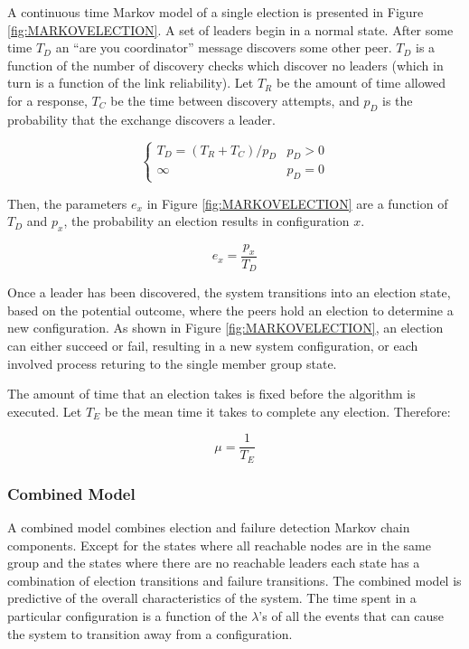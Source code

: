 A continuous time Markov model of a single election is presented in Figure \ref{fig:MARKOVELECTION}.
A set of leaders begin in a normal state. After some time $T_{D}$ an ``are you coordinator''
message discovers some other peer. $T_{D}$ is a function of the number of discovery
checks which discover no leaders (which in turn is a function of the link reliability). Let
$T_{R}$ be the amount of time allowed for a response, $T_{C}$ be the time between
discovery attempts, and $p_{D}$ is the probability that the exchange discovers a leader.

\begin{equation}
\begin{cases}
T_{D} = ( T_{R}+T_{C} ) / p_{D} & p_{D} > 0 \\
\infty & p_{D} = 0
\end{cases}
\end{equation}

Then, the parameters $e_x$ in Figure \ref{fig:MARKOVELECTION} are a function of $T_{D}$ and $p_{x}$,
the probability an election results in configuration $x$.

\begin{equation}
e_x = \frac{p_{x}}{T_{D}}
\end{equation}

Once a leader has been discovered, the system transitions into an election state, based on the
potential outcome, where the peers hold an election to determine a new configuration. As shown
in Figure \ref{fig:MARKOVELECTION}, an election can either succeed or fail, resulting in a new system
configuration, or each involved process returing to the single member group state.
 
The amount of time that an election takes is fixed before the algorithm is executed. 
Let $T_{E}$ be the mean time it takes to complete any election. Therefore:

\begin{equation}
\mu = \frac{1}{T_{E}}
\end{equation}

\subsubsection{Combined Model}

A combined model combines election and failure detection Markov chain components. Except for the
states where all reachable nodes are in the same group and the states where there are no reachable
leaders each state has a combination of election transitions and failure transitions.                                                        
The combined model is predictive of the overall characteristics of the system. The
time spent in a particular configuration is a function of the $\lambda$'s of all the
events that can cause the system to transition away from a configuration. 

